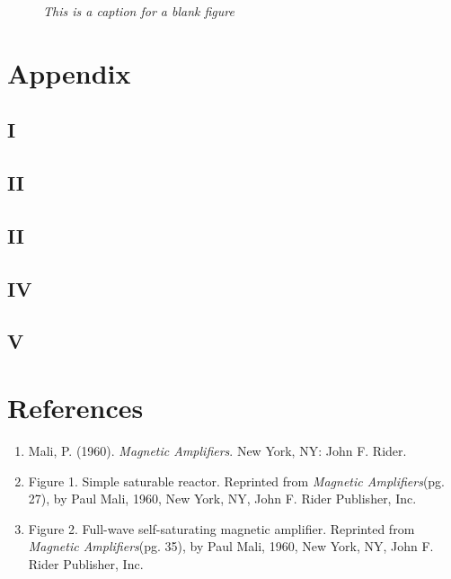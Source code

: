 \documentclass[11pt]{article}
\begin{document}
\blindtext


     \begin{figure}[H]
	\centering	
	\caption{\textit{This is a caption for a blank figure}}	
	\end{figure}

\pagebreak

\section{Appendix}
\subsection{I}
\subsection{II}
\subsection{II}
\subsection{IV}
\subsection{V}	

\pagebreak

\section{References}
\begin{enumerate}
\item Mali, P. (1960).\textit{ Magnetic Amplifiers}. New York, NY: John F. Rider.
\item Figure 1. Simple saturable reactor. Reprinted from \textit{Magnetic Amplifiers}(pg. 27), by Paul Mali, 1960, New York, NY, John F. Rider Publisher, Inc.
\item Figure 2. Full-wave self-saturating magnetic amplifier. Reprinted from \textit{Magnetic Amplifiers}(pg. 35), by Paul Mali, 1960, New York, NY, John F. Rider Publisher, Inc.
\end{enumerate}	
\end{document}
